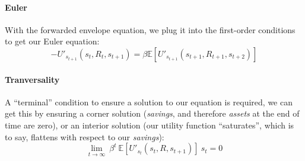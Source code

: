 \documentclass[a4paper,12pt]{article}
\begin{document}
\paragraph{Euler}
With the forwarded envelope equation, we plug it into the first-order conditions to get our Euler equation:
%
$$
- U'_{s_{t+1}}(s_t, R_t, s_{t+1}) = \beta \mathbb{E} [U'_{s_{t+1}}(s_{t+1}, R_{t+1}, s_{t+2})]
$$
%
\paragraph{Tranversality} A ``terminal'' condition to ensure a solution to our equation is required, we can get this by ensuring a corner solution (\textit{savings}, and therefore \textit{assets} at the end of time are zero), or an interior solution (our utility function ``saturates'', which is to say, flattens with respect to our \textit{savings}):
%
$$
\lim_{t \rightarrow \infty} \ \beta^t\  \mathbb{E}[ U'_{s_t}(s_t, R, s_{t+1})] \ s_t = 0
$$
%
\end{document}
